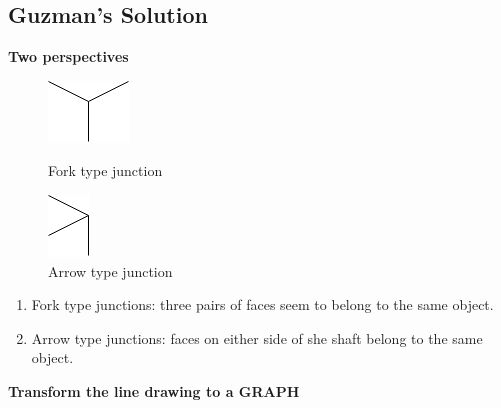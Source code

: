 \documentclass[12pt]{book}
\begin{document}
\subsection{Guzman's Solution}
\textbf{Two perspectives}
\begin{figure}[htbp]
	\centering
	\begin{minipage}[t]{0.48\textwidth}
		\centering
		\includegraphics[]{Figure/Figure7_2.png}
		\caption{Fork type junction}
	\end{minipage}
	\begin{minipage}[t]{0.48\textwidth}
		\centering
		\includegraphics[]{Figure/Figure7_3.png}
		\caption{Arrow type junction}
	\end{minipage}
\end{figure}
\begin{enumerate}
	\item Fork type junctions: three pairs of faces seem to belong to the same object. 
	\item Arrow type junctions: faces on either side of she shaft belong to the same object.
\end{enumerate}
\indent \indent \textbf{Transform the line drawing to a GRAPH}
\end{document}
